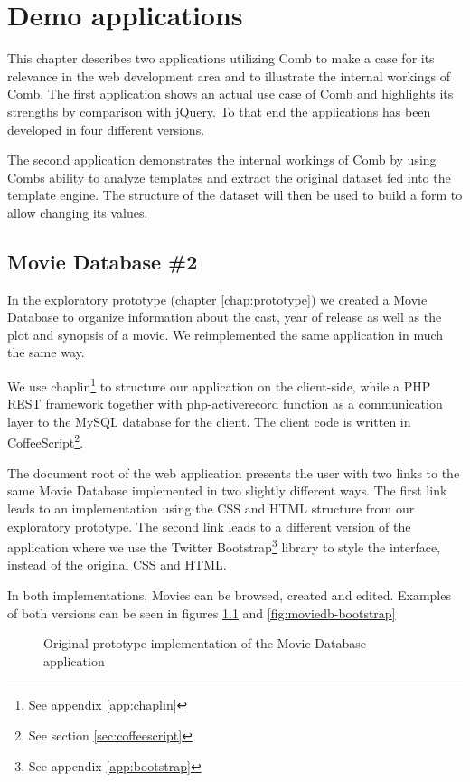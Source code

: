 \documentclass[thesis.tex]{subfiles}
\begin{document}
\chapter{Demo applications}
\label{chap:demo}
This chapter describes two applications utilizing Comb to make a case for
its relevance in the web development area and to illustrate the internal
workings of Comb.
The first application shows an actual use case of Comb and highlights its
strengths by comparison with jQuery. To that end the applications has been
developed in four different versions.

The second application demonstrates the internal workings of Comb by using Combs
ability to analyze templates and extract the original dataset fed into the
template engine. The structure of the dataset will then be used to build a form
to allow changing its values.

\section{Movie Database \#2}
In the exploratory prototype (chapter \ref{chap:prototype}) we created a
Movie Database to organize information about the cast, year of release as well
as the plot and synopsis of a movie. We reimplemented the same application
in much the same way.

We use chaplin\footnote{See appendix \ref{app:chaplin}} to structure our
application on the client-side, while a PHP REST framework together with
php-activerecord function as a communication layer to the MySQL database for the
client.
The client code is written in CoffeeScript\footnote{See
section \ref{sec:coffeescript}}.

The document root of the web application presents the user with two links to
the same Movie Database implemented in two slightly different ways.
The first link leads to an implementation using the CSS and HTML structure from
our exploratory prototype.
The second link leads to a different version of the application where we use the
Twitter Bootstrap\footnote{See appendix \ref{app:bootstrap}} library to style
the interface, instead of the original CSS and HTML.

In both implementations, Movies can be browsed, created and edited. Examples of
both versions can be seen in figures \ref{fig:moviedb-prototype} and
\ref{fig:moviedb-bootstrap}

\begin{figure}
	\centering
	\caption{Original prototype implementation of the Movie Database application}
	\label{fig:moviedb-prototype}
\end{figure}
\end{document}
